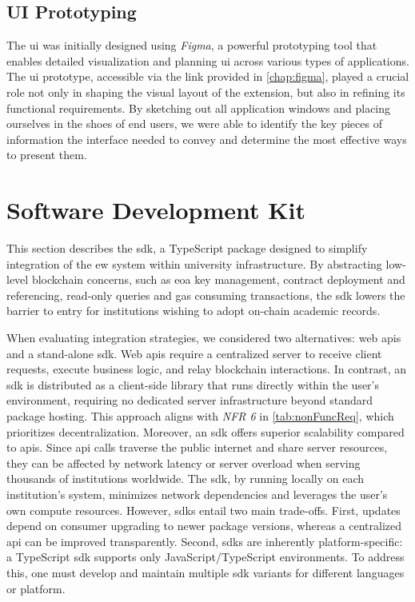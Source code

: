 \subsection{UI Prototyping}
The \gls{ui} was initially designed using \textit{Figma}, a powerful prototyping tool that enables detailed visualization and planning \gls{ui} across various types of applications. The \gls{ui} prototype, accessible via the link provided in \cref{chap:figma}, played a crucial role not only in shaping the visual layout of the extension, but also in refining its functional requirements. 
By sketching out all application windows and placing ourselves in the shoes of end users, we were able to identify the key pieces of information the interface needed to convey and determine the most effective ways to present them. 

\section{Software Development Kit}
\label{sec:sdkDesign}
This section describes the \acrlong{sdk}, a TypeScript package designed to simplify integration of the \acrlong{ew} system within university infrastructure. By abstracting low-level blockchain concerns, such as \acrshort{eoa} key management, contract deployment and referencing, read-only queries and gas consuming transactions, the \acrshort{sdk} lowers the barrier to entry for institutions wishing to adopt on-chain academic records.

When evaluating integration strategies, we considered two alternatives: web \acrshort{api}s and a stand-alone \acrshort{sdk}. Web \acrshort{api}s require a centralized server to receive client requests, execute business logic, and relay blockchain interactions. In contrast, an \acrshort{sdk} is distributed as a client-side library that runs directly within the user's environment, requiring no dedicated server infrastructure beyond standard package hosting. This approach aligns with \textit{NFR 6} in \cref{tab:nonFuncReq}, which prioritizes decentralization.
Moreover, an \acrshort{sdk} offers superior scalability compared to \acrshort{api}s. Since \acrshort{api} calls traverse the public internet and share server resources, they can be affected by network latency or server overload when serving thousands of institutions worldwide. The \acrshort{sdk}, by running locally on each institution's system, minimizes network dependencies and leverages the user's own compute resources.
However, \acrshort{sdk}s entail two main trade-offs. First, updates depend on consumer upgrading to newer package versions, whereas a centralized \acrshort{api} can be improved transparently. Second, \acrshort{sdk}s are inherently platform-specific: a TypeScript \acrshort{sdk} supports only JavaScript/TypeScript environments. To address this, one must develop and maintain multiple \acrshort{sdk} variants for different languages or platform.

